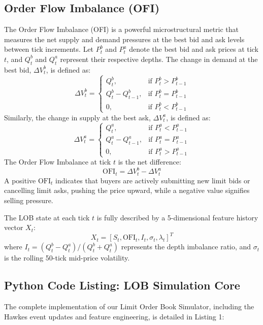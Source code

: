 \documentclass[11pt,a4paper]{article}
\begin{document}
\subsection{Order Flow Imbalance (OFI)}
The Order Flow Imbalance (OFI) is a powerful microstructural metric that measures the net supply and demand pressures at the best bid and ask levels between tick increments. Let $P_t^b$ and $P_t^a$ denote the best bid and ask prices at tick $t$, and $Q_t^b$ and $Q_t^a$ represent their respective depths. The change in demand at the best bid, $\Delta V_t^b$, is defined as:
\begin{equation}
    \Delta V_t^b = 
    \begin{cases} 
        Q_t^b, & \text{if } P_t^b > P_{t-1}^b \\
        Q_t^b - Q_{t-1}^b, & \text{if } P_t^b = P_{t-1}^b \\
        0, & \text{if } P_t^b < P_{t-1}^b
    \end{cases}
\end{equation}
Similarly, the change in supply at the best ask, $\Delta V_t^a$, is defined as:
\begin{equation}
    \Delta V_t^a = 
    \begin{cases} 
        Q_t^a, & \text{if } P_t^a < P_{t-1}^a \\
        Q_t^a - Q_{t-1}^a, & \text{if } P_t^a = P_{t-1}^a \\
        0, & \text{if } P_t^a > P_{t-1}^a
    \end{cases}
\end{equation}
The Order Flow Imbalance at tick $t$ is the net difference:
\begin{equation}
    \text{OFI}_t = \Delta V_t^b - \Delta V_t^a
\end{equation}
A positive $\text{OFI}_t$ indicates that buyers are actively submitting new limit bids or cancelling limit asks, pushing the price upward, while a negative value signifies selling pressure.

The LOB state at each tick $t$ is fully described by a 5-dimensional feature history vector $X_t$:
\begin{equation}
    X_t = [S_t, \text{OFI}_t, I_t, \sigma_t, \lambda_t]^T
\end{equation}
where $I_t = (Q_t^b - Q_t^a)/(Q_t^b + Q_t^a)$ represents the depth imbalance ratio, and $\sigma_t$ is the rolling 50-tick mid-price volatility.

\subsection{Python Code Listing: LOB Simulation Core}
The complete implementation of our Limit Order Book Simulator, including the Hawkes event updates and feature engineering, is detailed in Listing 1:
\end{document}
